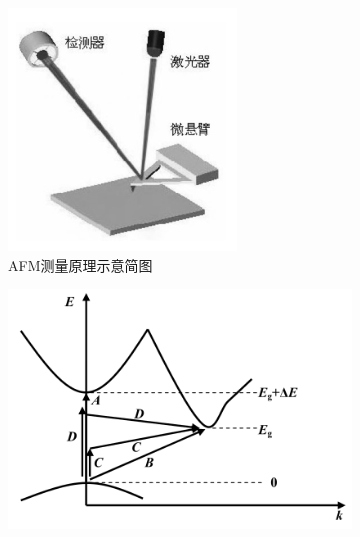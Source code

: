 \documentclass{article}
\begin{document}
\begin{figure}[H]
  \centering
  \begin{subfigure}{.25\textwidth}
    \centering
    \includegraphics[width=\linewidth]{figures/AFM}
    \caption{AFM测量原理示意简图}
  \end{subfigure}
  \begin{subfigure}{.35\textwidth}
    \centering
    \includegraphics[width=\linewidth]{figures/禁戒的代间直接跃迁}

\end{subfigure}
\end{figure}
\end{document}
